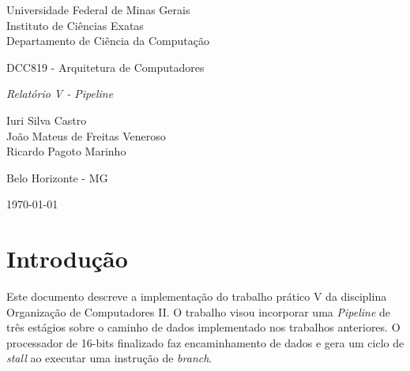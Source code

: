 \documentclass[11pt,a4paper,titlepage]{article}
\newcommand{\titulo}{\textit{Relatório V - Pipeline}}
\begin{document}
\begin{titlepage}
\begin{center}

\begin{large}
Universidade Federal de Minas Gerais\\
Instituto de Ciências Exatas\\
Departamento de Ciência da Computação\\
\end{large}

\vspace{20mm}

\begin{Large}
DCC819 - Arquitetura de Computadores
\end{Large}

\vspace{20mm}

\begin{LARGE}
\titulo
\end{LARGE}


\vspace{30mm}

\begin{Large}
\begin{center}
Iuri Silva Castro\\ João Mateus de Freitas Veneroso\\ Ricardo Pagoto Marinho \\
\end{center}
\end{Large}


\vspace{60mm}

{\sc Belo Horizonte - MG}

{\sc \today}

\end{center}
\end{titlepage}

\section{Introdução}\label{sec:desc}

Este documento descreve a implementação do trabalho prático V da disciplina
Organização de Computadores II. O trabalho visou incorporar uma \textit{Pipeline}
de três estágios sobre o caminho de dados implementado nos trabalhos anteriores.
O processador de 16-bits finalizado faz encaminhamento de dados e gera um ciclo
de \textit{stall} ao executar uma instrução de \textit{branch}.
\end{document}
